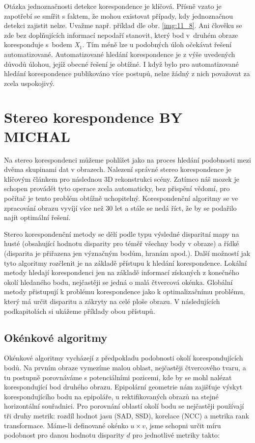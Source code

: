 Otázka jednoznačnosti detekce korespondence je klíčová. Přísně vzato je zapotřebí se smířit s faktem, že mohou existovat případy, kdy jednoznačnou detekci zajistit nelze. Uvažme např. příklad dle obr. \ref{img:11_8}. Ani člověku se zde bez doplňujících informací nepodaří stanovit, který bod v~druhém obraze koresponduje s~bodem \textit{X}$_1$. Tím méně lze u podobných úloh očekávat řešení automatizované. Automatizované hledání korespondence je z výše uvedených důvodů úlohou, jejíž obecné řešení je obtížné. I když bylo pro automatizované hledání korespondence publikováno více postupů, nelze žádný z nich považovat za zcela uspokojivý.

\section*{Stereo korespondence BY MICHAL}

Na stereo korespondenci můžeme pohlížet jako na proces hledání podobnosti mezi dvěma skupinami dat v obrazech. Nalezení správné stereo korespondence je klíčovým článkem pro následnou 3D rekonstrukci scény. Zatímco náš mozek je schopen provádět tyto operace zcela automaticky, bez přispění vědomí, pro počítač je tento problém obtížně uchopitelný. Korespondenční algoritmy se ve zpracování obrazu vyvíjí více než 30 let a stále se nedá říct, že by se podařilo najít optimální řešení.

Stereo korespondenční metody se dělí podle typu výsledné disparitní mapy na husté (obsahující hodnotu disparity pro téměř všechny body v obraze) a řídké (disparita je přiřazena jen význačným bodům, hranám apod.). Další možností jak tyto algoritmy rozčlenit je na základě přístupu k hledání korespondence. Lokální metody hledají korespondenci jen na základě informací získaných z konečného okolí hledaného bodu, nejčastěji se jedná o malá čtvercová okénka. Globální metody přistupují k problému korespondence jako k optimalizačnímu problému, který má určit disparitu a zákryty na celé ploše obrazu. V následujících podkapitolách si ukážeme příklady obou přístupů.

\subsection*{Okénkové algoritmy}
Okénkové algoritmy vycházejí z předpokladu podobnosti okolí korespondujících bodů. Na prvním obraze vymezíme malou oblast, nejčastěji čtvercového tvaru, a tu postupně porovnáváme s potenciálními pozicemi, kde by se mohl nalézat korespondující bod druhého obrazu. Epipolární geometrie nám zajišťuje výskyt korespondujícího bodu na epipoláře, u rektifikovaných obrazů na stejné horizontální souřadnici. Pro porovnání oblastí okolí bodu se nejčastěji používají tři druhy metrik: rozdíl hodnot jasu (SAD, SSD), korelace (NCC) a metrika rank transformace. Máme-li definované okénko $u \times v$, jsme schopni určit míru podobnost pro danou hodnotu disparity $d$ pro jednotlivé metriky takto: 

